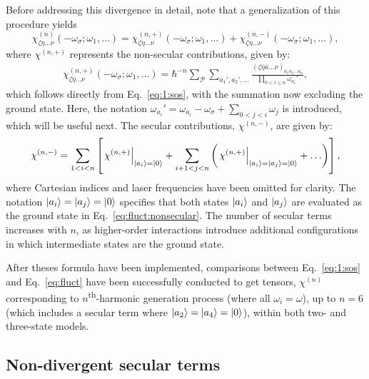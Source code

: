 \documentclass[12pt,a4paper]{article}
\begin{document}
Before addressing this divergence in detail, note that a generalization of this procedure yields \begin{equation}
	\chi^{(n)}_{\zeta \eta \ldots \nu}(-\omega_\sigma; \omega_1, \ldots)  = \chi^{(n,+)}_{\zeta \eta \ldots \nu}(-\omega_\sigma; \omega_1, \ldots)  + \chi^{(n,-)}_{\zeta \eta \ldots \nu}(-\omega_\sigma; \omega_1, \ldots) ,\label{eq:fluct}
\end{equation} where $\chi^{(n,+)}$ represents the non-secular contributions, given by:
\begin{align}
	\chi^{(n,+)}_{\zeta \eta \ldots \nu}(-\omega_\sigma; \omega_1, \ldots) = \hbar^{-n} \sum_\mathcal{P} \sum_{a_1', a_2', \ldots} \frac{(\zeta \bar{\eta} \bar{\kappa} \ldots \nu)_{a_1 a_2 \ldots a_n}}{\prod_{0 < i \leq n} \omega_{a_i}'} ,\label{eq:fluct:nonsecular}
\end{align}
which follows directly from Eq.~\eqref{eq:1:sos}, with the summation now excluding the ground state. Here, the notation $\omega_{a_i}' = \omega_{a_i} - \omega_\sigma + \sum_{0 < j < i} \omega_j$ is introduced, which will be useful next.
The secular contributions, $\chi^{(n,-)}$, are given by:
\begin{align}
	\chi^{(n,-)} = \sum_{1 < i < n} \left[ \left. \chi^{(n,+)} \right|_{\ket{a_i} = \ket{0}} + \sum_{i+1 < j < n} \left( \left. \chi^{(n,+)} \right|_{\ket{a_i} = \ket{a_j} = \ket{0}} + \ldots \right) \right],\label{eq:fluct:secular}
\end{align}
where Cartesian indices and laser frequencies have been omitted for clarity. The notation $\ket{a_i} = \ket{a_j} = \ket{0}$ specifies that both states $\ket{a_i}$ and $\ket{a_j}$ are evaluated as the ground state in Eq.~\eqref{eq:fluct:nonsecular}. The number of secular terms increases with $n$, as higher-order interactions introduce additional configurations in which intermediate states are the ground state. 

After theses formula have been implemented, comparisons between Eq.~\eqref{eq:1:sos} and Eq.~\eqref{eq:fluct} have been successfully conducted to get tensors, $\chi^{(n)}$ corresponding to $n$\textsuperscript{th}-harmonic generation process (where all $\omega_i = \omega$), up to $n = 6$ (which includes a secular term where $\ket{a_2} = \ket{a_4} = \ket{0}$), within both two- and three-state models.

\subsection{Non-divergent secular terms}
\end{document}
